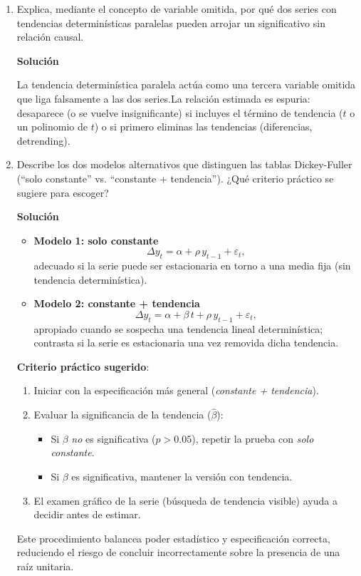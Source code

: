 \documentclass[10pt,a4paper]{article}
\begin{document}
\begin{enumerate}
\smallskip
\noindent
La multicolinealidad no introduce sesgo en MCO, 
pero reduce su precisión y dificulta la interpretación individual de los efectos.

\item Explica, mediante el concepto de variable omitida, por qué dos series con tendencias determinísticas paralelas pueden arrojar un significativo sin relación causal.

\textbf{Solución}

La tendencia determinística paralela actúa como una tercera variable omitida que liga falsamente a las dos series.La relación estimada es espuria: desaparece (o se vuelve insignificante) si incluyes el término de tendencia ($t$ o un polinomio de $t$) o si primero eliminas las tendencias (diferencias, detrending).


\item Describe los dos modelos alternativos que distinguen las tablas Dickey-Fuller (“solo constante” vs. “constante + tendencia”). ¿Qué criterio práctico se sugiere para escoger?

\textbf{Solución}

\begin{itemize}
  \item \textbf{Modelo 1: solo constante}\\[2pt]
        \[
          \Delta y_t = \alpha + \rho\,y_{t-1} + \varepsilon_t,
        \]
        adecuado si la serie puede ser estacionaria en torno a una media fija
        (sin tendencia determinística).
  \item \textbf{Modelo 2: constante + tendencia}\\[2pt]
        \[
          \Delta y_t = \alpha + \beta\,t + \rho\,y_{t-1} + \varepsilon_t,
        \]
        apropiado cuando se sospecha una tendencia lineal determinística; contrasta
        si la serie es estacionaria una vez removida dicha tendencia.
\end{itemize}

\textbf{Criterio práctico sugerido}:
\begin{enumerate}
  \item Iniciar con la especificación más general (\emph{constante + tendencia}).
  \item Evaluar la significancia de la tendencia (\(\hat\beta\)):
        \begin{itemize}
          \item Si \(\beta\) \emph{no} es significativa (\(p>0.05\)), repetir la prueba con
                \emph{solo constante}.
          \item Si \(\beta\) es significativa, mantener la versión con tendencia.
        \end{itemize}
  \item El examen gráfico de la serie (búsqueda de tendencia visible) ayuda a decidir
        antes de estimar.
\end{enumerate}

\noindent
Este procedimiento balancea poder estadístico y especificación correcta,
reduciendo el riesgo de concluir incorrectamente sobre la presencia de una
raíz unitaria.

\end{enumerate}
\end{document}
